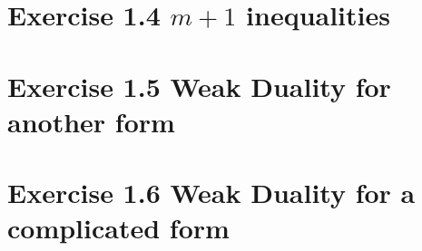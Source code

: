 \section{Exercise 1.4 $m+1$ inequalities}

\section{Exercise 1.5 Weak Duality for another form}

\section{Exercise 1.6 Weak Duality for a complicated form}
